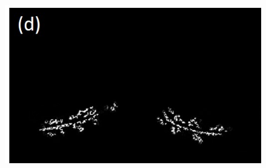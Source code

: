 \documentclass[]{spie}  %
\begin{document}
{\begin{figure}[htbp]
\begin{subfigure}
{\begin{minipage}[t]{0.288\linewidth}
  \centerline{}
	\label{fig:FissureDetection-c}
	\end{minipage}%
   }%
\end{subfigure}
\begin{subfigure}{
  \begin{minipage}[t]{0.287\linewidth}
  \includegraphics[width=\linewidth,trim={{.0\wd0} {.0\wd0} {.0\wd0} {.0\wd0}},clip]{Image/FissureDetection4.jpg}\label{fig:FissureDetection}
  \centerline{}
	\label{fig:FissureDetection-d}
	\end{minipage}%
   }%
\end{subfigure}
\begin{subfigure}{
  \begin{minipage}[t]{0.30\linewidth}

\end{minipage}}
\end{subfigure}
\end{figure}}
\end{document}

